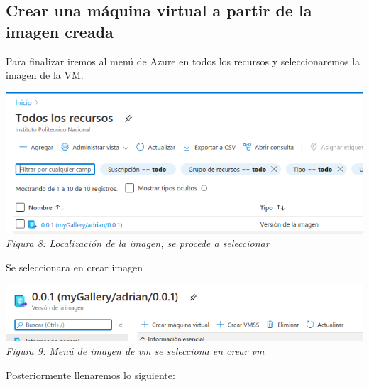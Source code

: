 \documentclass[10pt,executivepaper]{article}
\begin{document}
\subsection{Crear una máquina virtual a partir de la imagen creada}
Para finalizar iremos al menú de Azure en todos los recursos y seleccionaremos la imagen de la VM.
\begin{center}
  \includegraphics[scale=0.5]{imgs/8.png}\\
  \textit{Figura 8: Localización de la imagen, se procede a seleccionar}
\end{center}
Se seleccionara en crear imagen
\begin{center}
  \includegraphics[scale=0.5]{imgs/9.png}\\
  \textit{Figura 9: Menú de imagen de vm se selecciona en crear vm}
\end{center}
Posteriormente llenaremos lo siguiente:
\end{document}
